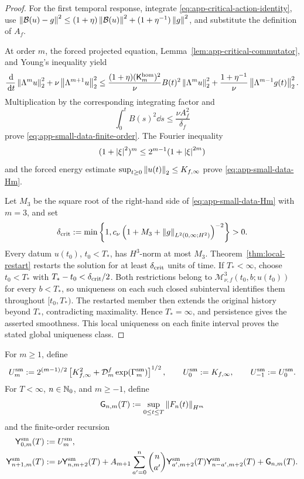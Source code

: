\begin{proof}
For the first temporal response, integrate
\eqref{eq:app-critical-action-identity}, use
\(\left\lVert \mathcal B(u)-g\right\rVert^2\le
(1+\eta)\left\lVert \mathcal B(u)\right\rVert^2
+(1+\eta^{-1})\left\lVert g\right\rVert^2\), and substitute the definition of
\(A_f\).

At order \(m\), the forced projected equation,
Lemma~\ref{lem:app-critical-commutator}, and Young's inequality yield
\[
 \frac{\,\mathrm d}{\,\mathrm d t}\left\lVert \Lambda^mu\right\rVert_2^2
 +\nu\left\lVert \Lambda^{m+1}u\right\rVert_2^2
 \le
 \frac{(1+\eta)(\mathsf K_m^{\rm hom})^2}{\nu}
 B(t)^2\left\lVert \Lambda^mu\right\rVert_2^2
 +\frac{1+\eta^{-1}}{\nu}\left\lVert \Lambda^{m-1}g(t)\right\rVert_2^2.
\]
Multiplication by the corresponding integrating factor and
\[
 \int_0^tB(s)^2\dd s\le\frac{\nu A_f^2}{\delta_f}
\]
prove \eqref{eq:app-small-data-finite-order}.  The Fourier inequality
\[
 (1+\left|\xi\right|^2)^m\le2^{m-1}(1+\left|\xi\right|^{2m})
\]
and the forced energy estimate
\(\sup_{t\ge0}\left\lVert u(t)\right\rVert_2\le K_{f,\infty}\) prove
\eqref{eq:app-small-data-Hm}.

Let \(M_3\) be the square root of the right-hand side of
\eqref{eq:app-small-data-Hm} with \(m=3\), and set
\[
 \delta_{\rm crit}
 :=\min\left\{1,
 c_\nu\left(1+M_3+\left\lVert g\right\rVert_{L^2(0,\infty;H^2)}\right)^{-2}
 \right\}>0.
\]
Every datum \(u(t_0)\), \(t_0<T_*\), has \(H^3\)-norm at most \(M_3\).
Theorem~\ref{thm:local-restart} restarts the solution for at least
\(\delta_{\rm crit}\) units of time.  If \(T_*<\infty\), choose
\(t_0<T_*\) with \(T_*-t_0<\delta_{\rm crit}/2\).  Both restrictions belong
 to \(\mathscr M_{\nu,f}^3(t_0,b;u(t_0))\) for every \(b<T_*\), so uniqueness on
each such closed subinterval identifies them throughout \([t_0,T_*)\).
The restarted member then extends the original history beyond \(T_*\),
contradicting maximality.  Hence \(T_*=\infty\), and persistence
 gives the asserted smoothness.  This local uniqueness on each finite
 interval proves the stated global uniqueness class.
\end{proof}

For \(m\ge1\), define
\[
 U_m^{\rm sm}
 :=
 2^{(m-1)/2}
 \left[
 K_{f,\infty}^2+
 \mathcal D_m^f\exp(\Gamma_m^{\rm sm})
 \right]^{1/2},
 \qquad
 U_0^{\rm sm}:=K_{f,\infty},
 \qquad
 U_{-1}^{\rm sm}:=U_0^{\rm sm}.
\]
For \(T<\infty\), \(n\in\mathbb N_0\), and \(m\ge-1\), define
\[
 \mathsf G_{n,m}(T):=
 \sup_{0\le t\le T}\left\lVert F_n(t)\right\rVert_{H^m}
\]
and the finite-order recursion
\begin{align}
 \mathsf Y_{0,m}^{\rm sm}(T)&:=U_m^{\rm sm},
 \label{eq:app-small-Y0}\\
 \mathsf Y_{n+1,m}^{\rm sm}(T)
 &:=
 \nu\mathsf Y_{n,m+2}^{\rm sm}(T)
 +A_{m+1}\sum_{a'=0}^{n}\binom n{a'}
 \mathsf Y_{a',m+2}^{\rm sm}(T)
 \mathsf Y_{n-a',m+2}^{\rm sm}(T)
 +\mathsf G_{n,m}(T).
 \label{eq:app-small-Yrec}
\end{align}

